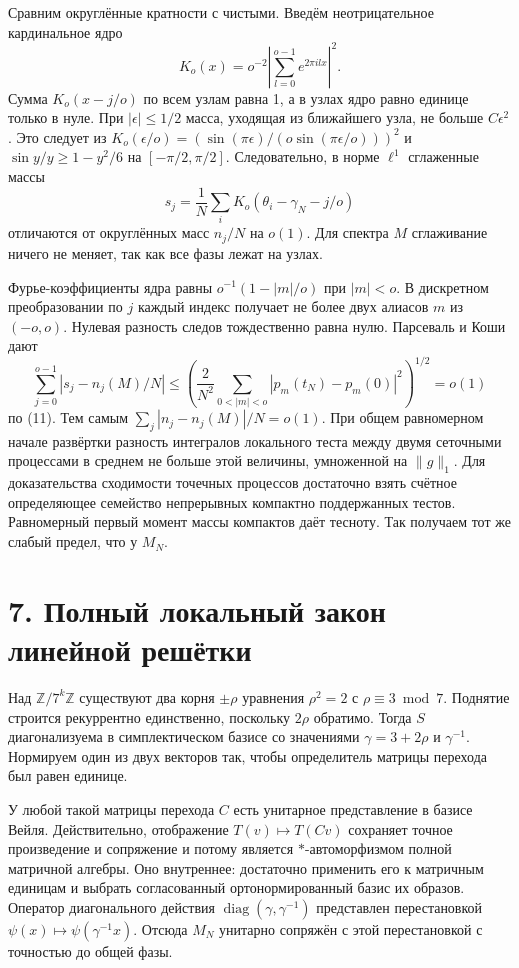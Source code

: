 \documentclass[11pt,a4paper]{article}
\newcommand{\Z}{\mathbb Z}
\newcommand{\sect}[1]{\section*{\sffamily\color{ink}#1}}
\begin{document}
Сравним округлённые кратности с чистыми. Введём неотрицательное кардинальное ядро
\[
      K_o(x)=o^{-2}\left|\sum_{l=0}^{o-1} e^{2\pi i l x}\right|^2 .
\]
Сумма $K_o(x-j/o)$ по всем узлам равна 1, а в узлах ядро равно единице только в нуле. При $|\epsilon|\le1/2$ масса, уходящая из ближайшего узла, не больше $C\epsilon^2$. Это следует из $K_o(\epsilon/o)=(\sin(\pi\epsilon)/(o\sin(\pi\epsilon/o)))^2$ и $\sin y/y\ge1-y^2/6$ на $[-\pi/2,\pi/2]$. Следовательно, в норме $\ell^1$ сглаженные массы
\[
           s_j=\frac1N\sum_i K_o(\theta_i-\gamma_N-j/o)
\]
отличаются от округлённых масс $n_j/N$ на $o(1)$. Для спектра $M$ сглаживание ничего не меняет, так как все фазы лежат на узлах.

Фурье-коэффициенты ядра равны $o^{-1}(1-|m|/o)$ при $|m|<o$. В дискретном преобразовании по $j$ каждый индекс получает не более двух алиасов $m$ из $( -o,o )$. Нулевая разность следов тождественно равна нулю. Парсеваль и Коши дают
\[
      \sum_{j=0}^{o-1}|s_j-n_j(M)/N|
           \le \left(\frac2{N^2}\sum_{0<|m|<o}
                       |p_m(t_N)-p_m(0)|^2\right)^{1/2}=o(1)
\]
по (11). Тем самым $\sum_j |n_j-n_j(M)|/N=o(1)$. При общем равномерном начале развёртки разность интегралов локального теста между двумя сеточными процессами в среднем не больше этой величины, умноженной на $\|g\|_1$. Для доказательства сходимости точечных процессов достаточно взять счётное определяющее семейство непрерывных компактно поддержанных тестов. Равномерный первый момент массы компактов даёт тесноту. Так получаем тот же слабый предел, что у $M_N$.
\newpage
\sect{7. Полный локальный закон линейной решётки}
Над $\Z/7^k\Z$ существуют два корня $\pm\rho$ уравнения $\rho^2=2$ с $\rho\equiv3\bmod7$. Поднятие строится рекуррентно единственно, поскольку $2\rho$ обратимо. Тогда $S$ диагонализуема в симплектическом базисе со значениями $\gamma=3+2\rho$ и $\gamma^{-1}$. Нормируем один из двух векторов так, чтобы определитель матрицы перехода был равен единице.

У любой такой матрицы перехода $C$ есть унитарное представление в базисе Вейля. Действительно, отображение $T(v)\mapsto T(Cv)$ сохраняет точное произведение и сопряжение и потому является $*$-автоморфизмом полной матричной алгебры. Оно внутреннее: достаточно применить его к матричным единицам и выбрать согласованный ортонормированный базис их образов. Оператор диагонального действия $\operatorname{diag}(\gamma,\gamma^{-1})$ представлен перестановкой $\psi(x)\mapsto\psi(\gamma^{-1}x)$. Отсюда $M_N$ унитарно сопряжён с этой перестановкой с точностью до общей фазы.
\end{document}

